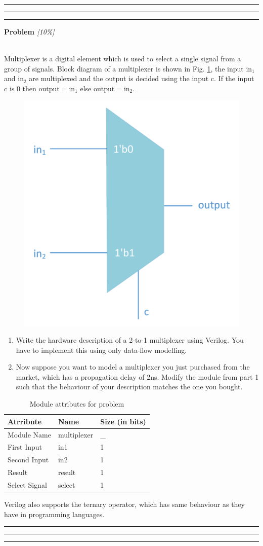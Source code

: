 \documentclass[a4paper,10pt]{article}
\theoremstyle{mytheor}
\newcounter{problemNumber}
\newcommand {
  \insertProblem}[2]{
  \vspace{0.5cm}
  \hrule \hrule \hrule
  \vspace{0.3cm}
  
  {
    \setlength{\parindent}{0}

    {
      \color{greatblue}
      \textbf{\Large{Problem \theproblemNumber}}
      \hfill
      \textit{[#1]}
    }

  }

  \vspace{6pt}\\#2

  \addtocounter{problemNumber}{1}

  \vspace{0.2cm}
  \hrule \hrule \hrule
  \vspace{0.5cm}
}
\newcounter{hintCount} %
\newcommand{\hintcounter}[1]{%
  \refstepcounter{hintCount}%
  \thehintCount%
  \label{#1}}%
\newcounter{hintcnt}
\newcommand{\hint}[2] {
  \begin{tcolorbox}[arc=1pt,colback=blue!5!white,colframe=blue!75!black,title=\textbf{Hint - \hintcounter{#1}}]  
    #2
  \end{tcolorbox}
  \addtocounter{hintcnt}{1}
}
\begin{document}
\insertProblem {10\%} { Multiplexer is a digital element which is used to
  select a single signal from a group of signals. Block diagram of a
  multiplexer is shown in Fig. \ref{multiplexer}, the input
  $\text{in}_1$ and $\text{in}_2$ are multiplexed and the output is
  decided using the input $\text{c}$. If the input c is 0 then
  $\text{output}=\text{in}_1$ else $\text{output}=\text{in}_2$.
  
  \begin{figure}[!h] \centering  
    \includegraphics[width=0.3\linewidth]{./resources/multiplexer.pdf} 
    \caption{} 
    \label{multiplexer} 
  \end{figure}

  \begin{enumerate}    
  \item Write the hardware description of a 2-to-1 multiplexer using
    Verilog. You have to implement this using only data-flow
    modelling.
  \item Now suppose you want to model a multiplexer you just purchased
    from the market, which has a propagation delay of 2ns. Modify the
    module from part 1 such that the behaviour of your description
    matches the one you bought.
    
  \end{enumerate}
    \begin{table}[!ht]
      \centering
      \caption{Module attributes for problem \theproblemNumber}
      \renewcommand{\arraystretch}{1.1}
      \begin{tabularx}{0.8\textwidth}{|X|X|X|}
        \hline
        \rowcolor{greatblue}
        \color{white} Atrribute & \color{white}Name & \color{white}Size (in bits) \\
        \hline
        Module Name   & multiplexer     & \_  \\
        First Input   & in1             &  1  \\
        Second Input  & in2             &  1  \\
        Result        & result          &  1  \\
        Select Signal & select          &  1  \\
        \hline
      \end{tabularx}
    \end{table}

    \hint{hint:problem-2}{Verilog also supports the ternary operator, which has same
      behaviour as they have in programming languages.}
}
\end{document}
